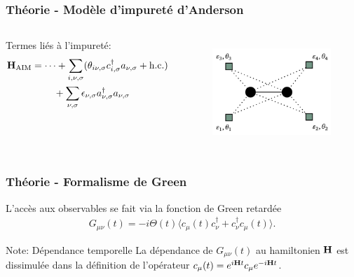 \begin{frame}
    \frametitle{Théorie - Modèle d'impureté d'Anderson}
    \begin{columns}
        Termes liés à l'impureté:
        {\scriptsize
        \begin{align*}
            \vb{H}_{\text{AIM}} &= \dots + \sum_{i,\nu,\sigma}(\theta_{i\nu,\sigma}c_{i,\sigma}^\dagger a_{\nu,\sigma} + \text{h.c.}) \\
                                &\hspace{0.8cm}+\sum_{\nu,\sigma}\epsilon_{\nu,\sigma}a^\dagger_{\nu,\sigma}a_{\nu,\sigma}
        \end{align*}
        }
        \begin{figure}
           \centering
            \includegraphics[scale=0.2]{./figures/theory/1D_2s_4b_cluster.png}
            \label{fig: 1D_2s_4b_HAIM}
        \end{figure}
    \end{columns}
\end{frame}

\begin{frame}
    \frametitle{Théorie - Formalisme de Green}
    L'accès aux observables se fait via la fonction de Green retardée\footnotemark
    \begin{align}
        G_{\mu\nu}(t) = -i\Theta(t)\langle c_\mu(t)c_\nu^\dagger + c_\nu^\dagger c_\mu(t)\rangle.
        \label{eq: green_retarded}
    \end{align}
    \vspace{1cm}
    \pause
    \begin{noteblock}{Note: Dépendance temporelle}
      La dépendance de $G_{\mu\nu}(t)$ au hamiltonien $\vb{H}$ est dissimulée dans la définition de l'opérateur $c_\mu(t) = e^{i\vb{H}t}c_\mu e^{-i\vb{H}t}$.
    \end{noteblock}
\end{frame}

